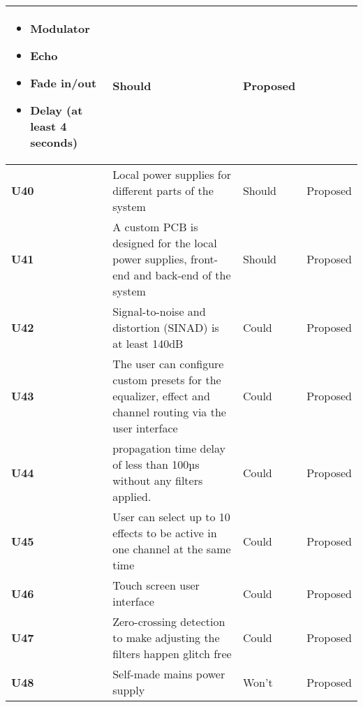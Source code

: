 \begin{longtable}{|l|p{10cm}|l|l|}
\begin{itemize}
		\item Modulator
		\item Echo
		\item Fade in/out
		\item Delay (at least 4 seconds)
	\end{itemize}																												& Should & Proposed\\ \hline
	\textbf{U40} &Local power supplies for different parts of the system 														& Should & Proposed\\ \hline
	\textbf{U41} &A custom PCB is designed for the local power supplies, front-end and back-end of the system					& Should & Proposed\\ \hline
	\textbf{U42} &Signal-to-noise and distortion (SINAD) is at least 140dB 														& Could  & Proposed\\ \hline
	\textbf{U43} &The user can configure custom presets for the equalizer, effect and channel routing via the user interface	& Could  & Proposed\\ \hline
	\textbf{U44} &propagation time delay of less than 100µs without any filters applied. 										& Could  & Proposed\\ \hline
	\textbf{U45} &User can select up to 10 effects to be active in one channel at the same time 								& Could  & Proposed\\ \hline
	\textbf{U46} &Touch screen user interface 																					& Could  & Proposed\\ \hline
	\textbf{U47} &Zero-crossing detection to make adjusting the filters happen glitch free										& Could  & Proposed\\ \hline
	\textbf{U48} &Self-made mains power supply  																				& Won't  & Proposed\\ \hline
\end{longtable}